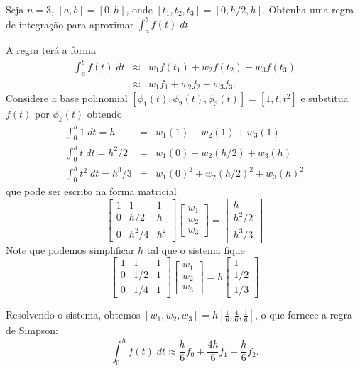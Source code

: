 \begin{ex}
Seja $n=3$, $[a,b]=[0,h]$, onde $[t_1,t_2,t_3]=[0,h/2,h]$. Obtenha uma regra de integração para aproximar $\int _a^b f(t)\;dt$.
\end{ex}
\begin{sol}
A regra terá a forma
\begin{eqnarray}
  \int _a^b f(t)\;dt & \approx& w_1f(t_1)+w_2f(t_2)+w_3f(t_3)\\
                 & \approx& w_1f_1   +w_2f_2   +w_3f_3.
\end{eqnarray}
Considere a base polinomial $[\phi _1(t),\phi _2(t),\phi _3(t)]=[1, t, t^2]$ e substitua $f(t)$ por $\phi_k(t)$ obtendo
\begin{eqnarray}
   \int _0^h 1   \;dt = h     &=&  w_1(1)   +w_2(1)     + w_3(1) \\
   \int _0^h t   \;dt = h^2/2 &=&  w_1(0)   +w_2(h/2)   + w_3(h) \\
   \int _0^h t^2 \;dt = h^3/3 &=&  w_1(0)^2 +w_2(h/2)^2 + w_3(h)^2
\end{eqnarray}
que pode ser escrito na forma matricial
\begin{equation}
\begin{bmatrix}
    1  &  1    &  1 \\
    0  &  h/2    & h  \\
    0  &  h^2/4    & h^2
\end{bmatrix}
\begin{bmatrix}
 w_1 \\ w_2\\ w_3
\end{bmatrix}
=
\begin{bmatrix}
 h  \\ h^2/2 \\ h^3/3
\end{bmatrix}
\end{equation}
Note que podemos simplificar $h$ tal que o sistema fique
\begin{equation}
\begin{bmatrix}
    1  &  1    &  1 \\
    0  &  1/2  & 1  \\
    0  &  1/4  & 1
\end{bmatrix}
\begin{bmatrix}
 w_1 \\ w_2\\ w_3
\end{bmatrix}
=
h
\begin{bmatrix}
 1  \\ 1/2 \\ 1/3
\end{bmatrix}
\end{equation}

Resolvendo o sistema, obtemos $\displaystyle [w_1,w_2,w_3]=h\left[\frac{1}{6},\frac{4}{6},\frac{1}{6}\right]$, o que fornece a regra de Simpson:
\begin{equation}
  \int _0^h f(t) \;dt \approx  \frac{h}{6}f_0+\frac{4h}{6}f_1+\frac{h}{6}f_2.
\end{equation}
\end{sol}

